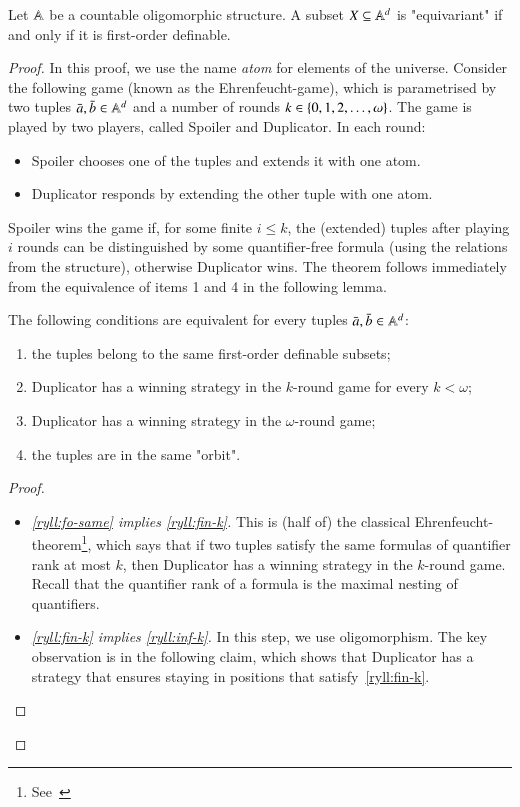 \begin{theorem}\label{thm:ryll}
    Let $\mathbb A$ be a countable oligomorphic structure. A subset $X \subseteq \mathbb A^d$ is "equivariant" if and only if it is first-order definable.
\end{theorem}
\begin{proof}
    In this proof, we use the name \emph{atom} for elements of the universe. 
	Consider the following game (known as the Ehrenfeucht-\fraisse game), which is parametrised by two tuples $\bar a, \bar b \in \mathbb A^d$ and a number of rounds $k \in \{0,1,2,\ldots,\omega\}$. The game is played by two players, called Spoiler and Duplicator. In each round:
	\begin{itemize}
				\item Spoiler chooses one of the tuples and extends it with one atom.
		\item Duplicator responds by extending the other tuple with one atom.
			\end{itemize}
	Spoiler wins the game if, for some finite $i \le k$, the (extended) tuples after playing $i$ rounds can be distinguished by some quantifier-free formula (using the relations from the structure), otherwise Duplicator wins. 
	The theorem follows immediately from the equivalence of items 1 and 4 in the following lemma.
	\begin{lemma}
		The following conditions are equivalent for every tuples $\bar a, \bar b \in \mathbb A^d$:
		\begin{enumerate}
			\item \label{ryll:fo-same} the tuples belong to the same first-order definable subsets;
			\item \label{ryll:fin-k} Duplicator has a winning strategy in the $k$-round game for every $k < \omega$;
			\item \label{ryll:inf-k} Duplicator has a winning strategy in the $\omega$-round game;
			\item \label{ryll:same-orbit} the tuples are in the same "orbit".
		\end{enumerate}
	\end{lemma}
	
		
	
	\begin{proof}\ 
		\begin{itemize}
			\item \emph{\ref{ryll:fo-same} implies \ref{ryll:fin-k}.} This is (half of) the classical Ehrenfeucht-\fraisse theorem\footnote{See~\cite[Section 3.2]{hodges1993model}}, which says that if two tuples satisfy the same formulas of quantifier rank at most $k$, then Duplicator has a winning strategy in the $k$-round game. Recall that the quantifier rank of a formula is the maximal nesting of quantifiers. 
		 \item \emph{\ref{ryll:fin-k} implies \ref{ryll:inf-k}.} In this step, we use oligomorphism.
The key observation is in the  following claim, which shows that Duplicator has a strategy that ensures staying in positions that satisfy~\ref{ryll:fin-k}.
		 

\end{itemize}
\end{proof}
\end{proof}
